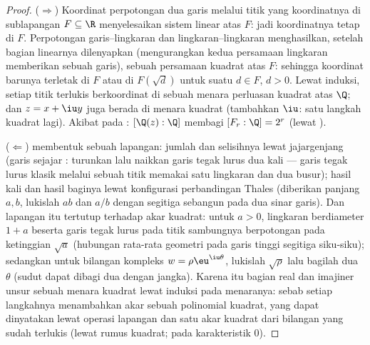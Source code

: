 \begin{proof}
($\Rightarrow$) Koordinat perpotongan dua garis
melalui titik yang koordinatnya di sublapangan $F \subseteq \R$
menyelesaikan sistem linear atas $F$: jadi koordinatnya tetap di $F$. Perpotongan garis--lingkaran
dan lingkaran--lingkaran menghasilkan, setelah bagian linearnya dilenyapkan
(mengurangkan kedua persamaan lingkaran memberikan sebuah garis),
sebuah persamaan kuadrat atas $F$: sehingga koordinat barunya terletak di $F$
atau di $F(\sqrt d)$ untuk suatu $d \in F$, $d > 0$. Lewat induksi,
setiap titik terlukis berkoordinat di sebuah menara perluasan
kuadrat atas $\Q$; dan $z = x + \iu y$ juga berada di menara kuadrat
(tambahkan $\iu$: satu langkah kuadrat lagi). Akibat pada :
$[\Q(z):\Q]$ membagi $[F_r : \Q] = 2^r$ (lewat ).

($\Leftarrow$)  membentuk sebuah lapangan: jumlah dan
selisihnya lewat jajargenjang (garis sejajar :
turunkan lalu naikkan garis tegak lurus dua kali --- garis tegak lurus klasik
melalui sebuah titik memakai satu lingkaran dan dua busur);
hasil kali dan hasil baginya lewat konfigurasi perbandingan Thales
(diberikan panjang $a, b$, lukislah $ab$ dan $a/b$ dengan segitiga
sebangun pada dua sinar garis). Dan lapangan itu tertutup terhadap akar
kuadrat: untuk $a > 0$, lingkaran berdiameter $1 + a$ beserta
garis tegak lurus pada titik sambungnya berpotongan pada ketinggian $\sqrt a$
(hubungan rata-rata geometri pada garis tinggi segitiga siku-siku); sedangkan untuk
bilangan kompleks $w = \rho\eu^{\iu\theta}$, lukislah $\sqrt\rho$ lalu
bagilah dua $\theta$ (sudut dapat dibagi dua dengan jangka).
Karena itu bagian real dan imajiner unsur sebuah menara kuadrat
 lewat induksi pada menaranya: sebab setiap langkahnya
menambahkan akar sebuah polinomial kuadrat, yang dapat dinyatakan lewat operasi lapangan
dan satu akar kuadrat dari bilangan yang sudah terlukis (lewat
rumus kuadrat; pada karakteristik $0$).
\end{proof}

